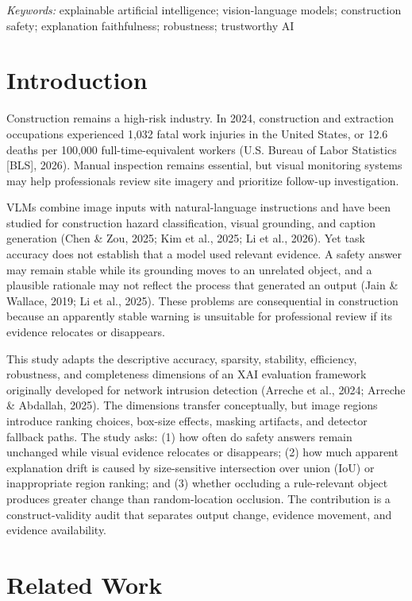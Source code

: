 \documentclass[12pt,letterpaper,twoside]{article}
\begin{document}
\noindent\textit{Keywords:} explainable artificial intelligence; vision-language models; construction safety; explanation faithfulness; robustness; trustworthy AI

\section{Introduction}

Construction remains a high-risk industry. In 2024, construction and extraction occupations experienced 1,032 fatal work injuries in the United States, or 12.6 deaths per 100,000 full-time-equivalent workers (U.S. Bureau of Labor Statistics [BLS], 2026). Manual inspection remains essential, but visual monitoring systems may help professionals review site imagery and prioritize follow-up investigation.

VLMs combine image inputs with natural-language instructions and have been studied for construction hazard classification, visual grounding, and caption generation (Chen \& Zou, 2025; Kim et al., 2025; Li et al., 2026). Yet task accuracy does not establish that a model used relevant evidence. A safety answer may remain stable while its grounding moves to an unrelated object, and a plausible rationale may not reflect the process that generated an output (Jain \& Wallace, 2019; Li et al., 2025). These problems are consequential in construction because an apparently stable warning is unsuitable for professional review if its evidence relocates or disappears.

This study adapts the descriptive accuracy, sparsity, stability, efficiency, robustness, and completeness dimensions of an XAI evaluation framework originally developed for network intrusion detection (Arreche et al., 2024; Arreche \& Abdallah, 2025). The dimensions transfer conceptually, but image regions introduce ranking choices, box-size effects, masking artifacts, and detector fallback paths. The study asks: (1) how often do safety answers remain unchanged while visual evidence relocates or disappears; (2) how much apparent explanation drift is caused by size-sensitive intersection over union (IoU) or inappropriate region ranking; and (3) whether occluding a rule-relevant object produces greater change than random-location occlusion. The contribution is a construct-validity audit that separates output change, evidence movement, and evidence availability.

\section{Related Work}
\end{document}
